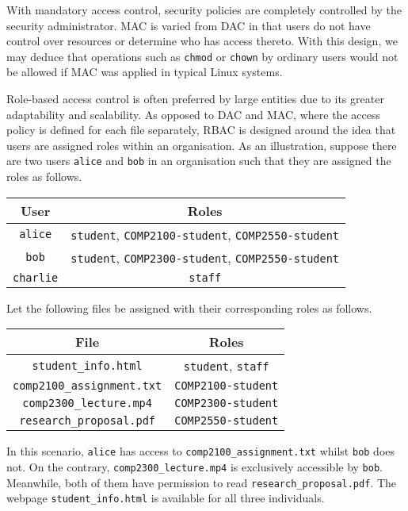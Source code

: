 \documentclass{article}
\begin{document}
With mandatory access control, security policies are completely controlled
by the security administrator. MAC is varied from DAC in that users do not
have control over resources or determine who has access thereto.\cite{models}
With this design, we may deduce that operations such as \texttt{chmod} or
\texttt{chown} by ordinary users would not be allowed if MAC was applied in
typical Linux systems.

Role-based access control is often preferred by large entities due to its
greater adaptability and scalability. As opposed to DAC and MAC, where the
access policy is defined for each file separately, RBAC is designed around
the idea that users are assigned roles within an organisation.\cite{models}
As an illustration, suppose there are two users \texttt{alice} and \texttt{bob}
in an organisation such that they are assigned the roles as follows.

\begin{center} \begin{tabular}{c|c}
    User & Roles\\ \hline \texttt{alice} & \texttt{student},
    \texttt{COMP2100-student}, \texttt{COMP2550-student}\\ \texttt{bob} &
    \texttt{student}, \texttt{COMP2300-student}, \texttt{COMP2550-student}\\
    \texttt{charlie} & \texttt{staff}
\end{tabular} \end{center}

Let the following files be assigned with their corresponding roles as follows.

\begin{center} \begin{tabular}{c|c}
    File & Roles\\ \hline \texttt{student\_info.html} &
    \texttt{student}, \texttt{staff}\\ \texttt{comp2100\_assignment.txt}
    & \texttt{COMP2100-student}\\ \texttt{comp2300\_lecture.mp4} &
    \texttt{COMP2300-student}\\ \texttt{research\_proposal.pdf} &
    \texttt{COMP2550-student}
\end{tabular} \end{center}

In this scenario, \texttt{alice} has access to
\texttt{comp2100\_assignment.txt} whilst \texttt{bob} does not. On the
contrary, \texttt{comp2300\_lecture.mp4} is exclusively accessible
by \texttt{bob}. Meanwhile, both of them have permission to read
\texttt{research\_proposal.pdf}. The webpage \texttt{student\_info.html}
is available for all three individuals.
\end{document}
